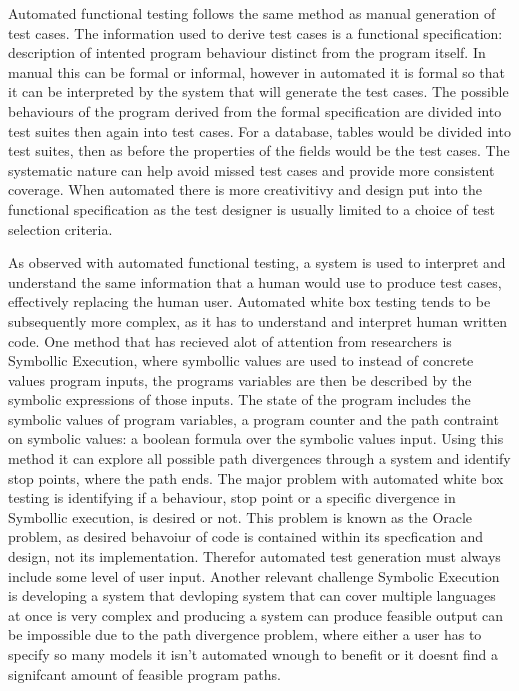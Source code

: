 \documentclass{article}
\begin{document}
\par Automated functional testing follows the same method as manual generation of test cases. The information used to derive test cases is a functional specification: description of intented program behaviour distinct from the program itself. In manual this can be formal or informal, however in automated it is formal so that it can be interpreted by the system that will generate the test cases. The possible behaviours of the program derived from the formal specification are divided into test suites then again into test cases. For a database, tables would be divided into test suites, then as before the properties of the fields would be the test cases. The systematic nature can help avoid missed test cases and provide more consistent coverage. When automated there is more creativitivy and design put into the functional specification as the test designer is usually limited to a choice of test selection criteria.\cite{young2008software}
\par As observed with automated functional testing, a system is used to interpret and understand the same information that a human would use to produce test cases, effectively replacing the human user. Automated white box testing tends to be subsequently more complex, as it has to understand and interpret human written code. One method that has recieved alot of attention from researchers is Symbollic Execution, where symbollic values are used to instead of concrete values program inputs, the programs variables are then be described by the symbolic expressions of those inputs. The state of the program includes the symbolic values of program variables, a program counter and the path contraint on symbolic values: a boolean formula over the symbolic values input. Using this method it can explore all possible path divergences through a system and identify stop points, where the path ends. The major problem with automated white box testing is identifying if a behaviour, stop point or a specific divergence in Symbollic execution, is desired or not. This problem is known as the Oracle problem, as desired behavoiur of code is contained within its specfication and design, not its implementation. Therefor automated test generation must always include some level of user input. Another relevant challenge Symbolic Execution is developing a system that devloping system that can cover multiple languages at once is very complex and producing a system can produce feasible output can be impossible due to the path divergence problem, where either a user has to specify so many models it isn't automated wnough to benefit or it doesnt find a signifcant amount of feasible program paths.
\end{document}
